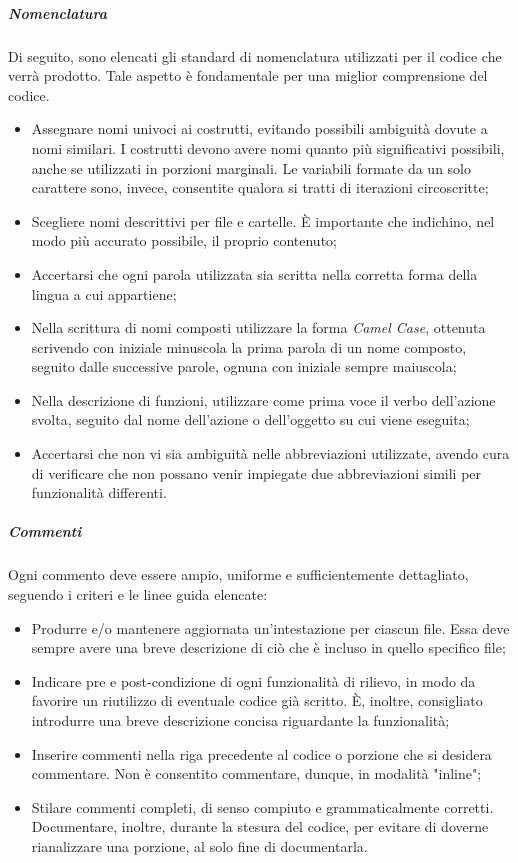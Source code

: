 			\subparagraph{Nomenclatura}
			Di seguito, sono elencati gli standard di nomenclatura utilizzati per il codice che verrà prodotto. Tale aspetto è fondamentale per una miglior comprensione del codice.
			\begin{itemize}
			\item Assegnare nomi univoci ai costrutti, evitando possibili ambiguità dovute a nomi similari. I costrutti devono avere nomi quanto più significativi possibili, anche se utilizzati in porzioni marginali. Le variabili formate da un solo carattere sono, invece, consentite qualora si tratti di iterazioni circoscritte;
			\item Scegliere nomi descrittivi per file e cartelle. \MakeUppercase{è} importante che indichino, nel modo più accurato possibile, il proprio contenuto;
			\item Accertarsi che ogni parola utilizzata sia scritta nella corretta forma della lingua a cui appartiene;
			\item Nella scrittura di nomi composti utilizzare la forma \textit{Camel Case}, ottenuta scrivendo con iniziale minuscola la prima parola di un nome composto, seguito dalle successive parole, ognuna con iniziale sempre maiuscola;
			\item Nella descrizione di funzioni, utilizzare come prima voce il verbo dell'azione svolta, seguito dal nome dell'azione o dell'oggetto su cui viene eseguita;
			\item Accertarsi che non vi sia ambiguità nelle abbreviazioni utilizzate, avendo cura di verificare che non possano venir impiegate due abbreviazioni simili per funzionalità differenti.
			\end{itemize}
			
			\subparagraph{Commenti}
			Ogni commento deve essere ampio, uniforme e sufficientemente dettagliato, seguendo i criteri e le linee guida elencate:
			\begin{itemize}
			\item Produrre e/o mantenere aggiornata un'intestazione per ciascun file. Essa deve sempre avere una breve descrizione di ciò che è incluso in quello specifico file;
			\item Indicare pre e post-condizione di ogni funzionalità di rilievo, in modo da favorire un riutilizzo di eventuale codice già scritto. \MakeUppercase{è}, inoltre, consigliato introdurre una breve descrizione concisa riguardante la funzionalità;
			\item Inserire commenti nella riga precedente al codice o porzione che si desidera commentare. Non è consentito commentare, dunque, in modalità "inline";
			\item Stilare commenti completi, di senso compiuto e grammaticalmente corretti. Documentare, inoltre, durante la stesura del codice, per evitare di doverne rianalizzare una porzione, al solo fine di documentarla.
			\end{itemize}
		
